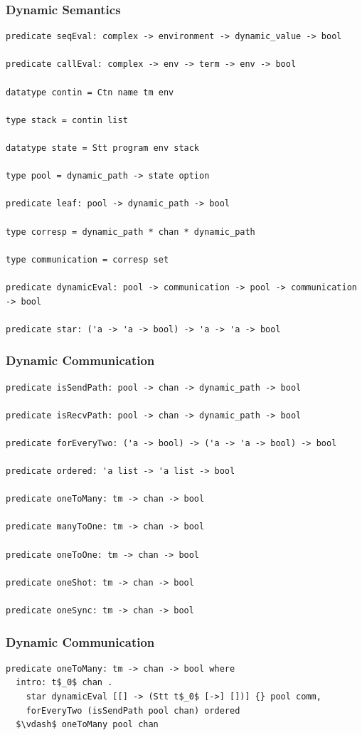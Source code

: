 \documentclass{beamer}
\begin{document}
\begin{frame}[fragile]
\frametitle{Dynamic Semantics}
\begin{lstlisting}[language=logic, mathescape]
predicate seqEval: complex -> environment -> dynamic_value -> bool 

predicate callEval: complex -> env -> term -> env -> bool 

datatype contin = Ctn name tm env

type stack = contin list

datatype state = Stt program env stack 

type pool = dynamic_path -> state option

predicate leaf: pool -> dynamic_path -> bool

type corresp = dynamic_path * chan * dynamic_path

type communication = corresp set 

predicate dynamicEval: pool -> communication -> pool -> communication -> bool

predicate star: ('a -> 'a -> bool) -> 'a -> 'a -> bool 
\end{lstlisting}
\end{frame}


\begin{frame}[fragile]
	\frametitle{Dynamic Communication}
\begin{lstlisting}[language=logic, mathescape]
predicate isSendPath: pool -> chan -> dynamic_path -> bool 

predicate isRecvPath: pool -> chan -> dynamic_path -> bool

predicate forEveryTwo: ('a -> bool) -> ('a -> 'a -> bool) -> bool

predicate ordered: 'a list -> 'a list -> bool

predicate oneToMany: tm -> chan -> bool

predicate manyToOne: tm -> chan -> bool

predicate oneToOne: tm -> chan -> bool

predicate oneShot: tm -> chan -> bool

predicate oneSync: tm -> chan -> bool
\end{lstlisting}
\end{frame}

\begin{frame}[fragile]
	\frametitle{Dynamic Communication}
\begin{lstlisting}[language=logic, mathescape]
predicate oneToMany: tm -> chan -> bool where
  intro: t$_0$ chan .
    star dynamicEval [[] -> (Stt t$_0$ [->] [])] {} pool comm,
    forEveryTwo (isSendPath pool chan) ordered
  $\vdash$ oneToMany pool chan
\end{lstlisting}
\end{frame}
\end{document}
